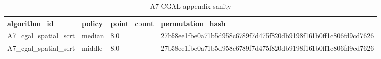 \begin{table}
\caption{A7 CGAL appendix sanity}
\label{tab:a7_cgal_appendix}
\begin{tabular}{llll}
\toprule
algorithm\_id & policy & point\_count & permutation\_hash \\
\midrule
A7\_cgal\_spatial\_sort & median & 8.0 & 27b58ee1fbe0a71b5d958c6789f7d475f820db9198f161b0ff1c806fd9cd7626 \\
A7\_cgal\_spatial\_sort & middle & 8.0 & 27b58ee1fbe0a71b5d958c6789f7d475f820db9198f161b0ff1c806fd9cd7626 \\
\bottomrule
\end{tabular}
\end{table}

